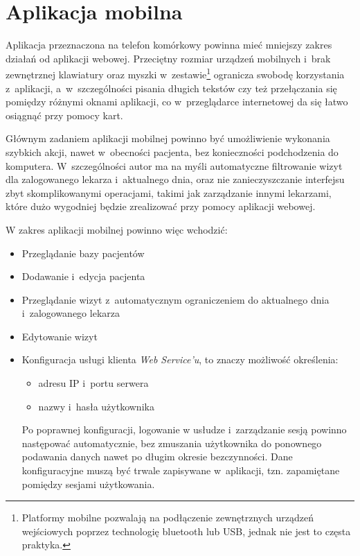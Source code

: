 \documentclass[11pt]{aghdpl}
\begin{document}
\section{Aplikacja mobilna}

Aplikacja przeznaczona na telefon komórkowy powinna mieć mniejszy zakres działań od aplikacji webowej. Przeciętny rozmiar urządzeń mobilnych i~brak zewnętrznej klawiatury oraz myszki w~zestawie\footnote{Platformy mobilne pozwalają na podłączenie zewnętrznych urządzeń wejściowych poprzez technologię bluetooth lub USB, jednak nie jest to częsta praktyka.} ogranicza swobodę korzystania z~aplikacji, a~w~szczególności pisania długich tekstów czy też przełączania się pomiędzy różnymi oknami aplikacji, co w~przeglądarce internetowej da się łatwo osiągnąć przy pomocy kart.

Głównym zadaniem aplikacji mobilnej powinno być umożliwienie wykonania szybkich akcji, nawet w~obecności pacjenta, bez konieczności podchodzenia do komputera. W~szczególności autor ma na myśli automatyczne filtrowanie wizyt dla zalogowanego lekarza i~aktualnego dnia, oraz nie zanieczyszczanie interfejsu zbyt skomplikowanymi operacjami, takimi jak zarządzanie innymi lekarzami, które dużo wygodniej będzie zrealizować przy pomocy aplikacji webowej.

W zakres aplikacji mobilnej powinno więc wchodzić:

\begin{itemize}
	\item Przeglądanie bazy pacjentów
	\item Dodawanie i~edycja pacjenta
	\item Przeglądanie wizyt z~automatycznym ograniczeniem do aktualnego dnia i~zalogowanego lekarza
	\item Edytowanie wizyt
	\item Konfiguracja usługi klienta \emph{Web Service'u}, to znaczy możliwość określenia:
	\begin{itemize}
		\item adresu IP i~portu serwera
		\item nazwy i~hasła użytkownika
	\end{itemize}
	Po poprawnej konfiguracji, logowanie w usłudze i~zarządzanie sesją powinno następować automatycznie, bez zmuszania użytkownika do ponownego podawania danych nawet po długim okresie bezczynności. Dane konfiguracyjne muszą być trwale zapisywane w~aplikacji, tzn. zapamiętane pomiędzy sesjami użytkowania.
\end{itemize}
\end{document}
